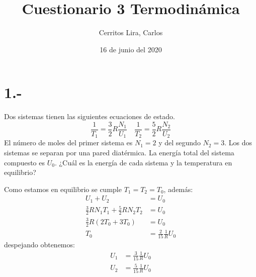 \documentclass{article}
\title{Cuestionario 3 Termodinámica}
\author{Cerritos Lira, Carlos}
\date{16 de junio del 2020}
\begin{document}
\maketitle
\section*{1.-}
Dos sistemas tienen las siguientes ecuaciones de estado. 
\[ \frac{1}{T_1} = \frac{3}{2}R\frac{N_1}{U_1} \quad 
\frac{1}{T_2} = \frac{5}{2}R\frac{N_2}{U_2} \]
El número de moles del primer sistema es $N_1 = 2$ y del segundo $N_2 = 3$. Los dos 
sistemas se separan por una pared diatérmica. La energía total del sistema compuesto es $U_0$. 
¿Cuál es la energía de cada sistema y la temperatura en equilibrio?
\begin{tcolorbox}[breakable]
    Como estamos en equilibrio se cumple $T_1=T_2=T_0$, además:
    \begin{align*}
        U_1+U_2 &= U_0 \\
        \frac{3}{2}RN_1T_1 + \frac{5}{2}RN_2T_2 &= U_0 \\
        \frac{3}{2}R(2T_0+3T_0) &= U_0 \\
        T_0 &= \frac{2}{15}\frac{1}{R} U_0
    \end{align*}
    despejando obtenemos:
    \begin{align*}
        U_1 &= \frac{3}{15}\frac{1}{R}U_0 \\
        U_2 &= \frac{5}{15}\frac{1}{R}U_0
    \end{align*}
\end{tcolorbox}
\end{document}
